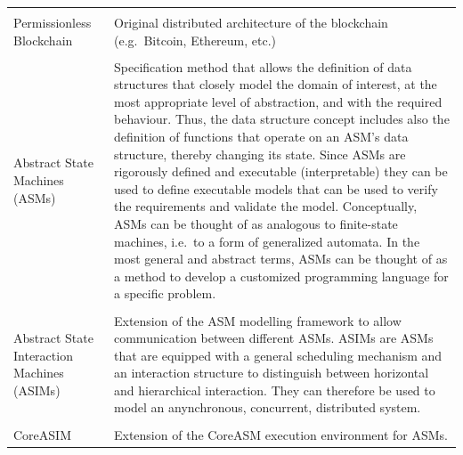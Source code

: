 {\begin{longtable}[]{@{}ll@{}}
\tabularnewline\tabularnewline
\begin{minipage}[t]{0.2\columnwidth}\raggedright\strut
Permissionless Blockchain
\strut
\end{minipage} & \begin{minipage}[t]{0.77\columnwidth}\raggedright\strut
Original distributed architecture of the blockchain (e.g.\ Bitcoin, Ethereum, etc.)
\strut
\end{minipage}

\tabularnewline\tabularnewline
\begin{minipage}[t]{0.2\columnwidth}\raggedright\strut
Abstract State Machines (ASMs)
\strut
\end{minipage} & \begin{minipage}[t]{0.77\columnwidth}\raggedright\strut
Specification method that allows the definition of data structures that closely model the domain of interest, at the most appropriate level of abstraction, and with the required behaviour. Thus, the data structure concept includes also the definition of functions that operate on an ASM's data structure, thereby changing its state. Since ASMs are rigorously defined and executable (interpretable) they can be used to define executable models that can be used to verify the requirements and validate the model. Conceptually, ASMs can be thought of as analogous to finite-state machines, i.e.\ to a form of generalized automata. In the most general and abstract terms, ASMs can be thought of as a method to develop a customized programming language for a specific problem.
\strut
\end{minipage}

\tabularnewline\tabularnewline
\begin{minipage}[t]{0.2\columnwidth}\raggedright\strut
Abstract State Interaction Machines (ASIMs)
\strut
\end{minipage} & \begin{minipage}[t]{0.77\columnwidth}\raggedright\strut
Extension of the ASM modelling framework to allow communication between different ASMs. ASIMs are ASMs that are equipped with a general scheduling mechanism and an interaction structure to distinguish between horizontal and hierarchical interaction. They can therefore be used to model an anynchronous, concurrent, distributed system.
\strut
\end{minipage}

\tabularnewline\tabularnewline
\begin{minipage}[t]{0.2\columnwidth}\raggedright\strut
CoreASIM
\strut
\end{minipage} & \begin{minipage}[t]{0.77\columnwidth}\raggedright\strut
Extension of the CoreASM execution environment for ASMs.
\strut
\end{minipage}


\end{longtable}}
